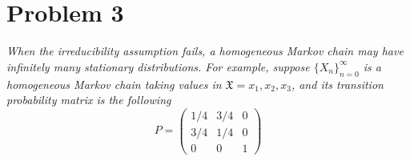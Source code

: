 \documentclass[12pt]{article}
\newcommand{\mfX}{\mathfrak{X}}
\begin{document}
    \color{black}

\pagebreak

\section*{Problem 3}
    \emph{When the irreducibility assumption fails, a homogeneous Markov chain may have infinitely
    many stationary distributions. For example, suppose $\{X_n\}_{n=0}^\infty$ is a homogeneous Markov
    chain taking values in $\mfX = {x_1, x_2, x_3}$, and its transition probability matrix is the following}
    \[P = \begin{pmatrix}
        1/4 & 3/4 & 0\\
        3/4 & 1/4 & 0\\
        0 & 0 & 1
    \end{pmatrix}\]
\end{document}
